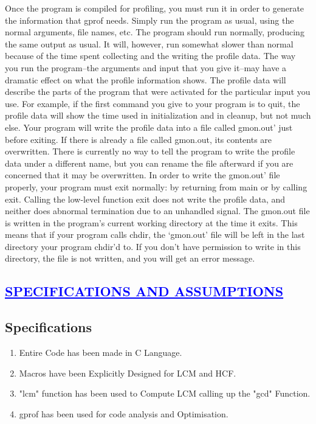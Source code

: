 \documentclass[a4paper,12pt]{report}
\begin{document}
Once the program is compiled for profiling, you must run it in order to generate the information that gprof needs.
Simply run the program as usual, using the normal arguments, file names, etc. The program should run normally, producing the same output as usual. 
It will, however, run somewhat slower than normal because of the time spent collecting and the writing the profile data.
The way you run the program--the arguments and input that you give it--may have a dramatic effect on what the profile information shows.
The profile data will describe the parts of the program that were activated for the particular input you use.
For example, if the first command you give to your program is to quit, the profile data will show the time used in initialization and in cleanup, but not much else.
Your program will write the profile data into a file called gmon.out' just before exiting. If there is already a file called gmon.out, its contents are overwritten.
There is currently no way to tell the program to write the profile data under a different name, but you can rename the file afterward if you are concerned that 
it may be overwritten.
In order to write the gmon.out' file properly, your program must exit normally: by returning from main or by calling exit. Calling the low-level function 
exit does not write the profile data, and neither does abnormal termination due to an unhandled signal.
The gmon.out file is written in the program's current working directory at the time it exits. This means that if your program calls chdir,
the `gmon.out' file will be left in the last directory your program chdir'd to. If you don't have permission to write in this directory,
the file is not written, and you will get an error message.

\begin{center}
\chapter{\textcolor{blue}{\underline {SPECIFICATIONS AND ASSUMPTIONS}}}
\end{center}
\section*{Specifications}

\begin{enumerate}
\item Entire Code has been made in C Language.
\item Macros have been Explicitly Designed for LCM and HCF.
\item "lcm" function has been used to Compute LCM calling up the "gcd" Function.
\item gprof has been used for code analysis and Optimisation.

\end{enumerate}
\end{document}
